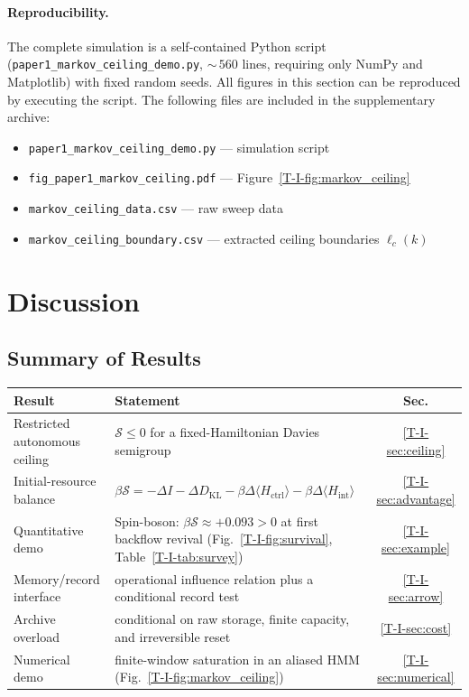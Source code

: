 \documentclass[12pt,a4paper,openany]{book}
\begin{document}
\paragraph{Reproducibility.}
\begin{sloppypar}
The complete simulation is a self-contained Python script
(\texttt{paper1\_markov\_ceiling\_demo.py}, ${\sim}\,560$
lines, requiring only NumPy and Matplotlib) with fixed
random seeds.  All figures in this section can be
reproduced by executing the script.  The following files
are included in the supplementary archive:
\begin{itemize}
\item \texttt{paper1\_markov\_ceiling\_demo.py} --- simulation script
\item \texttt{fig\_paper1\_markov\_ceiling.pdf} --- Figure~\ref{T-I-fig:markov_ceiling}
\item \texttt{markov\_ceiling\_data.csv} --- raw sweep data
\item \texttt{markov\_ceiling\_boundary.csv} --- extracted
  ceiling boundaries $\ell_c(k)$
\end{itemize}
\end{sloppypar}

\section{Discussion}
\label{T-I-sec:discussion}

\subsection{Summary of Results}

\begin{center}
\small
\setlength{\tabcolsep}{4pt}%
\begin{tabular}{@{}lP{7.5cm}c@{}}
\toprule
\textbf{Result} & \textbf{Statement} & \textbf{Sec.} \\
\midrule
Restricted autonomous ceiling &
  $\mathcal{S} \leq 0$ for a fixed-Hamiltonian Davies semigroup
  & \ref{T-I-sec:ceiling} \\[3pt]
Initial-resource balance &
  $\beta\mathcal{S} = -\Delta I
  - \Delta D_{\mathrm{KL}}
  - \beta\Delta\langle H_{\mathrm{ctrl}}\rangle
  - \beta\Delta\langle H_{\mathrm{int}}\rangle$
  & \ref{T-I-sec:advantage} \\[3pt]
Quantitative demo &
  Spin-boson: $\beta\mathcal{S} \approx +0.093 > 0$
  at first backflow revival (Fig.~\ref{T-I-fig:survival},
  Table~\ref{T-I-tab:survey})
  & \ref{T-I-sec:example} \\[3pt]
Memory/record interface &
  operational influence relation plus a conditional record test
  & \ref{T-I-sec:arrow} \\[3pt]
Archive overload &
  conditional on raw storage, finite capacity, and irreversible reset
  & \ref{T-I-sec:cost} \\[3pt]
Numerical demo &
  finite-window saturation in an aliased HMM
  (Fig.~\ref{T-I-fig:markov_ceiling})
  & \ref{T-I-sec:numerical} \\
\bottomrule
\end{tabular}
\end{center}
\end{document}
